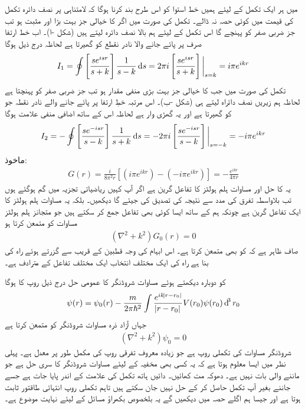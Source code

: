  میں ہر ایک تکمل کے لیئے ہمیں خط استوا کو اس طرح بند کرنا ہوگا  کہ لامتناہی پر نصف دائرہ تکمل کی قیمت میں کوئی حصہ نہ ڈالے۔ تکمل  کی صورت میں اگر  کا خیالی جز بہت بڑا اور مثبت ہو تب جز ضربی  صفر کو پہنچے گا اس تکمل کے لیئے ہم بالا نصف دائرہ لیتے ہیں (شکل -ا)۔ اب خط ارتفا صرف  پر پائے جانے والا نادر نقطع کو گھیرتا ہے لحاظہ درج ذیل ہوگا
\begin{align}\label{مساوات_بکھراو_آئی_الف}
	I_1 = \oint\left[\frac{se^{isr}}{s+k}\right]\frac{1}{s-k}\dif s = 2\pi i\left[\frac{se^{isr}}{s+k}\right]\bigg|_{s=k} = i\pi e^{ikr}
\end{align}
تکمل  کی صورت میں جب  کا خیالی جز بہت بڑی منفی مقدار ہو تب جز ضربی  صفر کو پہنچتا ہے لحاظہ ہم زیریں نصف
 دائراہ لیتے ہی (شکل -ب)۔ اس مرتبہ خطِ ارتفا  پر پائے جانے والے نادر نقطہ جو کو گھیرتا ہے اور یہ گھڑی وار ہے لحاظہ اس کے ساتھ اضافی منفی علامت ہوگا
\begin{align}\label{مساوات_بکھراو_آئی_ب}
	I_2 = -\oint\left[\frac{se^{-isr}}{s-k}\right]\frac{1}{s+k}\dif s = -2\pi i\left[\frac{se^{-isr}}{s-k}\right]\bigg|_{s=-k} = -i\pi e^{ikr}
\end{align}
ماخوذ:
\begin{align}
	G(r) = \frac{i}{8\pi^2r}\left[\left(i\pi e^{ikr}\right)-\left(-i\pi e^{ikr}\right)\right] = -\frac{e^{ikr}}{4\pi r}
\end{align}
یہ  کا حل اور مساوات ہلم ہولٹز کا تفاعل گرین ہے اگر آپ کہیں ریاضیاتی تجزیہ میں گم ہوگئے ہوں تب بلاواسطہ تفرق کی مدد سے نتیجہ کی تصدیق کی جیئے گا  دیکھیں۔ بلکہ یہ مساوات ہلم ہولٹز کا ایک تفاعل گرین ہے چونکہ ہم  کے ساتھ ایسا کوئی بھی تفاعل  جمع کر سکتے ہیں جو متجانز ہلم ہولٹز مساوات کو متمعن کرتا ہو
\begin{align}
	(\nabla^2+k^2)G_0(r) = 0
\end{align}
صاف ظاہر ہے کہ  کو  بھی متمعن کرتا ہے۔ اس ابہام کی وجہ قطبین کے قریب سے گزرتے ہوئے راہ کی بنا ہے راہ کی ایک مختلف انتخاب ایک مختلف تفاعل  کے مترادف ہے۔

 کو دوبارہ دیکھتے ہوئے مساوات شروڈنگر کا عمومی حل درج ذیل روپ کا ہوگا
\begin{align}
	\psi(r) = \psi_0(r)-\frac{m}{2\pi\hslash^2}\int\frac{e^{ik\abs{r-r_0}}}{\abs{r-r_0}}V(r_0)\psi(r_0)\dif^3r_0
\end{align}
جہاں  آزاد ذرہ مساوات شروڈنگر کو متمعن کرتا ہے
\begin{align}
	(\nabla^2+k^2)\psi_0 = 0
\end{align}
 شروڈنگر مساوات کی تکملی روپ ہے جو زیادہ معروف تفرقی روپ کی مکمل طور پر معدل ہے۔ پہلی نظر میں ایسا معلوم ہوتا ہے کہ یہ کسی بھی مخفیہ کے لیئے مساوات شروڈنگر کا سری حل ہے جو ماننے والی بات نہیں ہے۔ دھوکہ مت کھائیں۔ دائیں ہاتھ تکمل کی علامت کے اندر  پایا جات ہے جسے جاننے بغیر آپ تکمل حاصل کر کے حل نہیں جان سکتے ہیں  تاہم تکملی روپ انتہائی طاقتور ثابت ہوتا ہے اور جیسا ہم اگلے حصہ میں دیکھیں گے یہ بلخصوص بکھراؤ مسائل کے لیئے نہایت موضوع ہے۔

